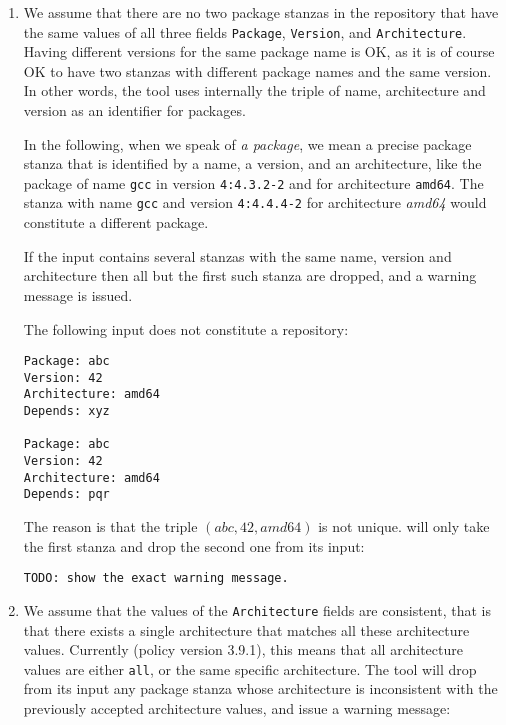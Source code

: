 \begin{enumerate}
\item
  We assume that there are no two package stanzas in the repository
  that have the same values of all three fields \texttt{Package},
  \texttt{Version}, and \texttt{Architecture}. Having different
  versions for the same package name is OK, as it is of course OK to
  have two stanzas with different package names and the same version.
  In other words, the \debcheck{} tool uses internally the triple of
  name, architecture and version as an identifier for packages.

  In the following, when we speak of \emph{a package}, we mean a
  precise package stanza that is identified by a name, a version, and
  an architecture, like the package of name \texttt{gcc} in version
  \texttt{4:4.3.2-2} and for architecture \texttt{amd64}. The stanza with name
  \texttt{gcc} and version \texttt{4:4.4.4-2} for architecture
  \textit{amd64} would constitute a different package.

  If the input contains several stanzas with the same name, version
  and architecture then all but the first such stanza are dropped, and a 
  warning message is issued.

\begin{example} The following input does not constitute a repository:
\begin{verbatim}
Package: abc
Version: 42
Architecture: amd64
Depends: xyz

Package: abc
Version: 42
Architecture: amd64
Depends: pqr
\end{verbatim}
The reason is that the triple $(abc,42,amd64)$ is not
unique. \debcheck{} will only take the first stanza and drop the
second one from its input:
\begin{verbatim}
TODO: show the exact warning message.
\end{verbatim}
\end{example}

\item
  We assume that the values of the \texttt{Architecture} fields are
  consistent, that is that there exists a single architecture that
  matches all these architecture values. Currently (policy version
  3.9.1), this means that all architecture values are either
  \texttt{all}, or the same specific architecture. The \debcheck{} tool
  will drop from its input any package stanza whose architecture is
  inconsistent with the previously accepted architecture values, and
  issue a warning message:


\end{enumerate}
